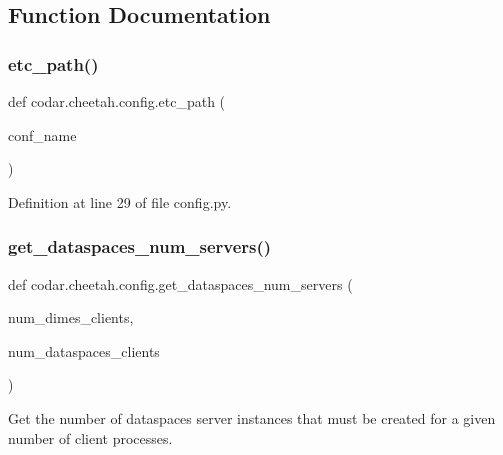 \subsection{Function Documentation}
\mbox{\label{namespacecodar_1_1cheetah_1_1config_a1028977b1cc5dc7f54bd65cb46256c8d}} 
\subsubsection{\texorpdfstring{etc\+\_\+path()}{etc\_path()}}
{\footnotesize\ttfamily def codar.\+cheetah.\+config.\+etc\+\_\+path (\begin{DoxyParamCaption}\item[{}]{conf\+\_\+name }\end{DoxyParamCaption})}



Definition at line 29 of file config.\+py.

\mbox{\label{namespacecodar_1_1cheetah_1_1config_a777b4339975017c9521b943afd76748d}} 
\subsubsection{\texorpdfstring{get\+\_\+dataspaces\+\_\+num\+\_\+servers()}{get\_dataspaces\_num\_servers()}}
{\footnotesize\ttfamily def codar.\+cheetah.\+config.\+get\+\_\+dataspaces\+\_\+num\+\_\+servers (\begin{DoxyParamCaption}\item[{}]{num\+\_\+dimes\+\_\+clients,  }\item[{}]{num\+\_\+dataspaces\+\_\+clients }\end{DoxyParamCaption})}

\begin{DoxyVerb}Get the number of dataspaces server instances that must be created for a
given number of client processes.
\end{DoxyVerb}
 

